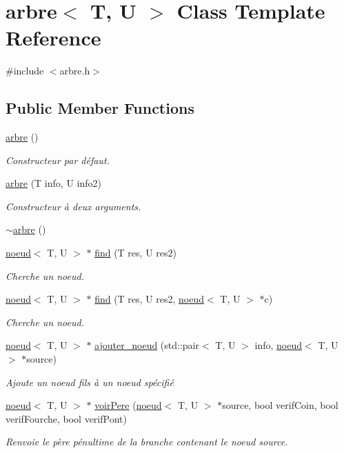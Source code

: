 \hypertarget{classarbre}{}\section{arbre$<$ T, U $>$ Class Template Reference}
\label{classarbre}


{\ttfamily \#include $<$arbre.\+h$>$}

\subsection*{Public Member Functions}
\begin{DoxyCompactItemize}
\item 
\hyperlink{classarbre_ad2dabd1079df654c9045765137638592}{arbre} ()
\begin{DoxyCompactList}\small\item\em Constructeur par défaut. \end{DoxyCompactList}\item 
\hyperlink{classarbre_aad1fbd379cfeeb08d03c4ea91144a431}{arbre} (T info, U info2)
\begin{DoxyCompactList}\small\item\em Constructeur à deux arguments. \end{DoxyCompactList}\item 
\hyperlink{classarbre_a42c3498c69b99f10b40824295ff30c9f}{$\sim$arbre} ()
\item 
\hyperlink{classnoeud}{noeud}$<$ T, U $>$ $\ast$ \hyperlink{classarbre_a41217bef9d41016b33fac301b6e5d65d}{find} (T res, U res2)
\begin{DoxyCompactList}\small\item\em Cherche un noeud. \end{DoxyCompactList}\item 
\hyperlink{classnoeud}{noeud}$<$ T, U $>$ $\ast$ \hyperlink{classarbre_a865863585882b2129eabec7bb34e7710}{find} (T res, U res2, \hyperlink{classnoeud}{noeud}$<$ T, U $>$ $\ast$c)
\begin{DoxyCompactList}\small\item\em Cherche un noeud. \end{DoxyCompactList}\item 
\hyperlink{classnoeud}{noeud}$<$ T, U $>$ $\ast$ \hyperlink{classarbre_aa0a822cdc25b6c5b43eb8ed2afc79799}{ajouter\+\_\+noeud} (std\+::pair$<$ T, U $>$ info, \hyperlink{classnoeud}{noeud}$<$ T, U $>$ $\ast$source)
\begin{DoxyCompactList}\small\item\em Ajoute un noeud fils à un noeud spécifié \end{DoxyCompactList}\item 
\hyperlink{classnoeud}{noeud}$<$ T, U $>$ $\ast$ \hyperlink{classarbre_acacc6bf49c2c7b4d50b865ad433d0f3e}{voir\+Pere} (\hyperlink{classnoeud}{noeud}$<$ T, U $>$ $\ast$source, bool verif\+Coin, bool verif\+Fourche, bool verif\+Pont)
\begin{DoxyCompactList}\small\item\em Renvoie le père pénultime de la branche contenant le noeud source. \end{DoxyCompactList}\end{DoxyCompactItemize}
